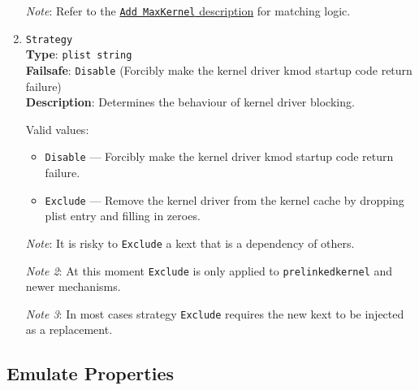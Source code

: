 \documentclass[]{article}
\providecommand{\tightlist}{%
  \setlength{\itemsep}{0pt}\setlength{\parskip}{0pt}}
\begin{document}
\begin{enumerate}
  \emph{Note}: Refer to the \hyperlink{kernmatch}{\texttt{Add\ MaxKernel} description} for matching logic.

\item
  \texttt{Strategy}\\
  \textbf{Type}: \texttt{plist\ string}\\
  \textbf{Failsafe}: \texttt{Disable} (Forcibly make the kernel driver kmod startup code return failure)\\
  \textbf{Description}: Determines the behaviour of kernel driver blocking.

  Valid values:

  \begin{itemize}
    \tightlist
    \item \texttt{Disable} --- Forcibly make the kernel driver kmod startup code return failure.
    \item \texttt{Exclude} --- Remove the kernel driver from the kernel cache by dropping plist entry and filling in zeroes.
  \end{itemize}

  \emph{Note}: It is risky to \texttt{Exclude} a kext that is a dependency of others.

  \emph{Note 2}: At this moment \texttt{Exclude} is only applied to \texttt{prelinkedkernel} and newer mechanisms.
  
  \emph{Note 3}: In most cases strategy \texttt{Exclude} requires the new kext to be injected as a replacement.

\end{enumerate}

\subsection{Emulate Properties}\label{kernelpropsemu}
\end{document}

